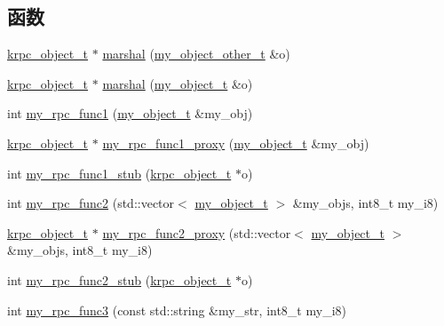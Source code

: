 \subsection*{函数}
\begin{DoxyCompactItemize}
\item 
\hyperlink{config_8h_a9c07dfc8c3b965f75b09f82fdb1bbb1e}{krpc\+\_\+object\+\_\+t} $\ast$ \hyperlink{namespacerpc__sample_ab2202ee13cd75c46e3f91be33afeaac6}{marshal} (\hyperlink{structrpc__sample_1_1my__object__other__t}{my\+\_\+object\+\_\+other\+\_\+t} \&o)
\item 
\hyperlink{config_8h_a9c07dfc8c3b965f75b09f82fdb1bbb1e}{krpc\+\_\+object\+\_\+t} $\ast$ \hyperlink{namespacerpc__sample_a1a0c14a7beffe073e84f5d156b915fdc}{marshal} (\hyperlink{structrpc__sample_1_1my__object__t}{my\+\_\+object\+\_\+t} \&o)
\item 
int \hyperlink{namespacerpc__sample_a9cbde3db2e2c41ccf893d9bb9d98a663}{my\+\_\+rpc\+\_\+func1} (\hyperlink{structrpc__sample_1_1my__object__t}{my\+\_\+object\+\_\+t} \&my\+\_\+obj)
\item 
\hyperlink{config_8h_a9c07dfc8c3b965f75b09f82fdb1bbb1e}{krpc\+\_\+object\+\_\+t} $\ast$ \hyperlink{namespacerpc__sample_a4c4d2f86fffa111a3d1356be078d8773}{my\+\_\+rpc\+\_\+func1\+\_\+proxy} (\hyperlink{structrpc__sample_1_1my__object__t}{my\+\_\+object\+\_\+t} \&my\+\_\+obj)
\item 
int \hyperlink{namespacerpc__sample_a4c2d6fb366e7559aeb1df4510cf8af84}{my\+\_\+rpc\+\_\+func1\+\_\+stub} (\hyperlink{config_8h_a9c07dfc8c3b965f75b09f82fdb1bbb1e}{krpc\+\_\+object\+\_\+t} $\ast$o)
\item 
int \hyperlink{namespacerpc__sample_ab316c95cfbb182bd7c074a83dc6ed59a}{my\+\_\+rpc\+\_\+func2} (std\+::vector$<$ \hyperlink{structrpc__sample_1_1my__object__t}{my\+\_\+object\+\_\+t} $>$ \&my\+\_\+objs, int8\+\_\+t my\+\_\+i8)
\item 
\hyperlink{config_8h_a9c07dfc8c3b965f75b09f82fdb1bbb1e}{krpc\+\_\+object\+\_\+t} $\ast$ \hyperlink{namespacerpc__sample_acfed9f5da95ebfc7f132819ea5af29d2}{my\+\_\+rpc\+\_\+func2\+\_\+proxy} (std\+::vector$<$ \hyperlink{structrpc__sample_1_1my__object__t}{my\+\_\+object\+\_\+t} $>$ \&my\+\_\+objs, int8\+\_\+t my\+\_\+i8)
\item 
int \hyperlink{namespacerpc__sample_a6c9ad9cfafcae822427e7e297600e5a1}{my\+\_\+rpc\+\_\+func2\+\_\+stub} (\hyperlink{config_8h_a9c07dfc8c3b965f75b09f82fdb1bbb1e}{krpc\+\_\+object\+\_\+t} $\ast$o)
\item 
int \hyperlink{namespacerpc__sample_a93e5778517cbdbcc2e43b27a6f7c8636}{my\+\_\+rpc\+\_\+func3} (const std\+::string \&my\+\_\+str, int8\+\_\+t my\+\_\+i8)

\end{DoxyCompactItemize}
